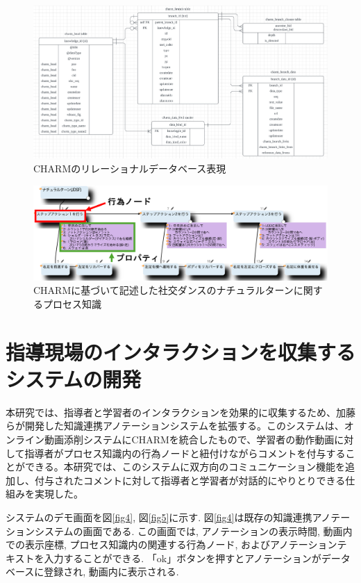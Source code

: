 \begin{figure}[htbp]
    \centering
    \includegraphics[width=1.0\linewidth]{./image/charm_database.png}
    \caption{CHARMのリレーショナルデータベース表現}
    \label{fig2}
\end{figure}

\begin{figure}[htbp]
    \centering
    \includegraphics[width=1.0\linewidth]{./image/charm_natural_turn.png}
    \caption{CHARMに基づいて記述した社交ダンスのナチュラルターンに関するプロセス知識}
    \label{fig3}
\end{figure}



\section{指導現場のインタラクションを収集するシステムの開発}
本研究では、指導者と学習者のインタラクションを効果的に収集するため、加藤らが開発した知識連携アノテーションシステム\cite{Kato2023}を拡張する。このシステムは、オンライン動画添削システムにCHARMを統合したもので、学習者の動作動画に対して指導者がプロセス知識内の行為ノードと紐付けながらコメントを付与することができる。本研究では、このシステムに双方向のコミュニケーション機能を追加し、付与されたコメントに対して指導者と学習者が対話的にやりとりできる仕組みを実現した。

システムのデモ画面を図\ref{fig4}, 図\ref{fig5}に示す. 図\ref{fig4}は既存の知識連携アノテーションシステムの画面である. この画面では, アノテーションの表示時間, 動画内での表示座標, プロセス知識内の関連する行為ノード, およびアノテーションテキストを入力することができる. 「ok」ボタンを押すとアノテーションがデータベースに登録され, 動画内に表示される.

